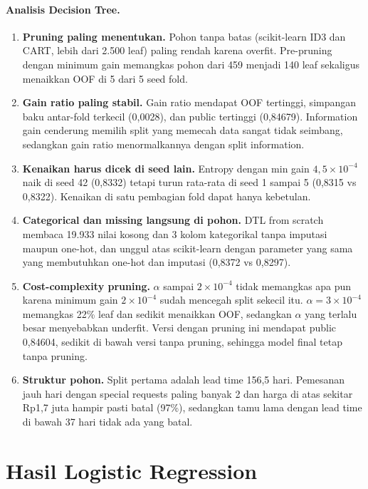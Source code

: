 \paragraph{Analisis Decision Tree.}
\begin{enumerate}
  \item \textbf{Pruning paling menentukan.} Pohon tanpa batas (scikit-learn ID3 dan CART, lebih dari 2.500 leaf) paling rendah karena overfit. Pre-pruning dengan minimum gain memangkas pohon dari 459 menjadi 140 leaf sekaligus menaikkan OOF di 5 dari 5 seed fold.
  \item \textbf{Gain ratio paling stabil.} Gain ratio mendapat OOF tertinggi, simpangan baku antar-fold terkecil (0,0028), dan public tertinggi (0,84679). Information gain cenderung memilih split yang memecah data sangat tidak seimbang, sedangkan gain ratio menormalkannya dengan split information.
  \item \textbf{Kenaikan harus dicek di seed lain.} Entropy dengan min gain $4{,}5\times10^{-4}$ naik di seed 42 (0,8332) tetapi turun rata-rata di seed 1 sampai 5 (0,8315 vs 0,8322). Kenaikan di satu pembagian fold dapat hanya kebetulan.
  \item \textbf{Categorical dan missing langsung di pohon.} DTL from scratch membaca 19.933 nilai kosong dan 3 kolom kategorikal tanpa imputasi maupun one-hot, dan unggul atas scikit-learn dengan parameter yang sama yang membutuhkan one-hot dan imputasi (0,8372 vs 0,8297).
  \item \textbf{Cost-complexity pruning.} $\alpha$ sampai $2\times10^{-4}$ tidak memangkas apa pun karena minimum gain $2\times10^{-4}$ sudah mencegah split sekecil itu. $\alpha=3\times10^{-4}$ memangkas 22\% leaf dan sedikit menaikkan OOF, sedangkan $\alpha$ yang terlalu besar menyebabkan underfit. Versi dengan pruning ini mendapat public 0,84604, sedikit di bawah versi tanpa pruning, sehingga model final tetap tanpa pruning.
  \item \textbf{Struktur pohon.} Split pertama adalah lead time 156,5 hari. Pemesanan jauh hari dengan special requests paling banyak 2 dan harga di atas sekitar Rp1,7 juta hampir pasti batal (97\%), sedangkan tamu lama dengan lead time di bawah 37 hari tidak ada yang batal.
\end{enumerate}

\section{Hasil Logistic Regression}

